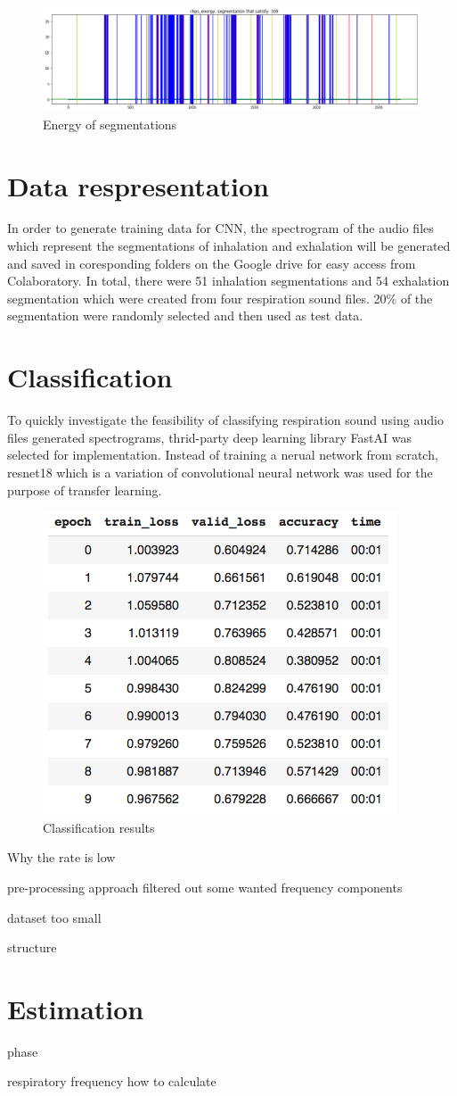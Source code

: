 \begin{figure}[h]
    \centerline{\includegraphics[scale=0.35]{figures/energy.png}}
    \caption{Energy of segmentations}
    \label{fig:energy}
\end{figure}

\section{Data respresentation}
In order to generate training data for CNN, the spectrogram of the audio files which represent the segmentations of inhalation and exhalation will be generated and saved in coresponding folders on the Google drive for easy access from Colaboratory. In total, there were 51 inhalation segmentations and 54 exhalation segmentation which were created from four respiration sound files. 20\% of the segmentation were randomly selected and then used as test data.

\section{Classification}
To quickly investigate the feasibility of classifying respiration sound using audio files generated spectrograms, thrid-party deep learning library FastAI was selected for implementation. Instead of training a nerual network from scratch, resnet18 which is a variation of convolutional neural network was used for the purpose of transfer learning. 

\begin{figure}[h]
    \centering
    \includegraphics[scale=0.6]{figures/classification_results.png}
    \caption{Classification results}
    \label{fig:classification_results}
\end{figure}

Why the rate is low

pre-processing approach filtered out some wanted frequency components

dataset too small

structure

\section{Estimation}

phase

respiratory frequency how to calculate